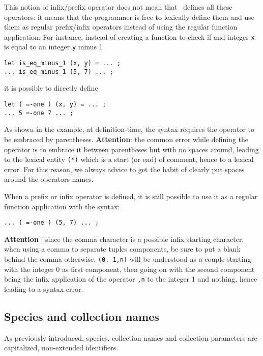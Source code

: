 \begin{itemize}
    This notion of infix/prefix operator does not mean that
    \focal\ defines all these operators: it means that the programmer
    is free to lexically define them and use them as regular
    prefix/infix operators instead of using the regular function
    application. For instance, instead of creating a function to check
    if and integer {\tt x} is equal to an integer {\tt y} minus 1
{\scriptsize
\begin{lstlisting}
let is_eq_minus_1 (x, y) = ... ;
... is_eq_minus_1 (5, 7) ... ;
\end{lstlisting}
}
    it is possible to directly define
{\scriptsize
\begin{lstlisting}
let ( =-one ) (x, y) = ... ;
... 5 =-one 7 ... ;
\end{lstlisting}
}
    As shown in the example, at definition-time, the syntax requires
    the operator to be embraced by parentheses. {\bf Attention}: the
    common error while defining the {\tt *} operator is to embrace it
    between parentheses but with no spaces around, leading to the
    lexical entity {\tt (*)} which is a start (or end) of comment,
    hence to a lexical error. For this reason, we always advice to
    get the habit of clearly put spaces around the operators names.

    When a prefix or infix operator is defined, it is still possible
    to use it as a regular function application with the syntax:
{\scriptsize
\begin{lstlisting}
... ( =-one ) (5, 7) ... ;
\end{lstlisting}
}

    {\bf Attention} : since the comma character is a possible infix
    starting character, when using a comma to separate tuples
    components, be sure to put a blank behind the comma otherwise,
    {\tt (0, 1,n)} will be understood as a couple starting with the
    integer 0 as first component, then going on with the second
    component being the infix application of the operator {\tt ,n} to
    the integer 1 and nothing, hence leading to a syntax error.

\end{itemize}



\subsection{Species and collection names}
 As previously introduced, species, collection
names and collection parameters are capitalized, non-extended
identifiers.



